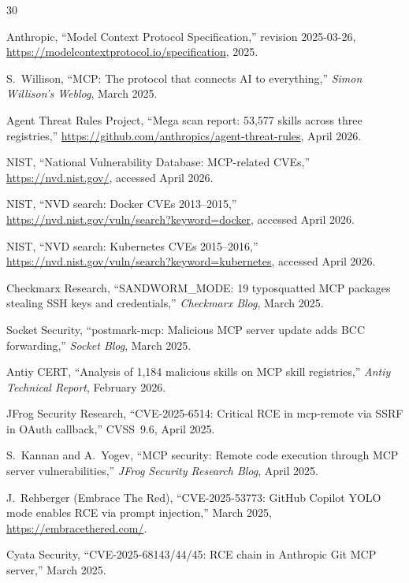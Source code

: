 \documentclass[11pt,twocolumn]{article}
\begin{document}
\begin{thebibliography}{30}

Anthropic, ``Model Context Protocol Specification,'' revision 2025-03-26,
\url{https://modelcontextprotocol.io/specification}, 2025.

S.~Willison, ``MCP: The protocol that connects AI to everything,''
\emph{Simon Willison's Weblog}, March 2025.

Agent Threat Rules Project, ``Mega scan report: 53,577 skills across three registries,''
\url{https://github.com/anthropics/agent-threat-rules}, April 2026.

NIST, ``National Vulnerability Database: MCP-related CVEs,''
\url{https://nvd.nist.gov/}, accessed April 2026.

NIST, ``NVD search: Docker CVEs 2013--2015,''
\url{https://nvd.nist.gov/vuln/search?keyword=docker}, accessed April 2026.

NIST, ``NVD search: Kubernetes CVEs 2015--2016,''
\url{https://nvd.nist.gov/vuln/search?keyword=kubernetes}, accessed April 2026.

Checkmarx Research, ``SANDWORM\_MODE: 19 typosquatted MCP packages stealing SSH keys and credentials,''
\emph{Checkmarx Blog}, March 2025.

Socket Security, ``postmark-mcp: Malicious MCP server update adds BCC forwarding,''
\emph{Socket Blog}, March 2025.

Antiy CERT, ``Analysis of 1,184 malicious skills on MCP skill registries,''
\emph{Antiy Technical Report}, February 2026.

JFrog Security Research, ``CVE-2025-6514: Critical RCE in mcp-remote via SSRF in OAuth callback,''
CVSS~9.6, April 2025.

S.~Kannan and A.~Yogev, ``MCP security: Remote code execution through MCP server vulnerabilities,''
\emph{JFrog Security Research Blog}, April 2025.

J.~Rehberger (Embrace The Red), ``CVE-2025-53773: GitHub Copilot YOLO mode enables RCE via prompt injection,''
March 2025, \url{https://embracethered.com/}.

Cyata Security, ``CVE-2025-68143/44/45: RCE chain in Anthropic Git MCP server,''
March 2025.


\end{thebibliography}
\end{document}
